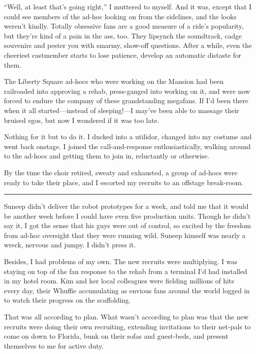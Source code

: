 “Well, at least that's going right,” I muttered to myself. And it
was, except that I could see members of the ad-hoc looking on from
the sidelines, and the looks weren't kindly. Totally obsessive fans
are a good measure of a ride's popularity, but they're kind of a
pain in the ass, too. They lipsynch the soundtrack, cadge souvenirs
and pester you with smarmy, show-off questions. After a while, even
the cheeriest castmember starts to lose patience, develop an
automatic distaste for them.

The Liberty Square ad-hocs who were working on the Mansion had been
railroaded into approving a rehab, press-ganged into working on it,
and were now forced to endure the company of these grandstanding
megafans. If I'd been there when it all started—instead of
sleeping!—I may've been able to massage their bruised egos, but now
I wondered if it was too late.

Nothing for it but to do it. I ducked into a utilidor, changed into
my costume and went back onstage. I joined the call-and-response
enthusiastically, walking around to the ad-hocs and getting them to
join in, reluctantly or otherwise.

By the time the choir retired, sweaty and exhausted, a group of
ad-hocs were ready to take their place, and I escorted my recruits
to an offstage break-room.

\begin{center}\rule{3in}{0.4pt}\end{center}

Suneep didn't deliver the robot prototypes for a week, and told me
that it would be another week before I could have even five
production units. Though he didn't say it, I got the sense that his
guys were out of control, so excited by the freedom from ad-hoc
oversight that they were running wild. Suneep himself was nearly a
wreck, nervous and jumpy. I didn't press it.

Besides, I had problems of my own. The new recruits were
multiplying. I was staying on top of the fan response to the rehab
from a terminal I'd had installed in my hotel room. Kim and her
local colleagues were fielding millions of hits every day, their
Whuffie accumulating as envious fans around the world logged in to
watch their progress on the scaffolding.

That was all according to plan. What wasn't according to plan was
that the new recruits were doing their own recruiting, extending
invitations to their net-pals to come on down to Florida, bunk on
their sofas and guest-beds, and present themselves to me for active
duty.

